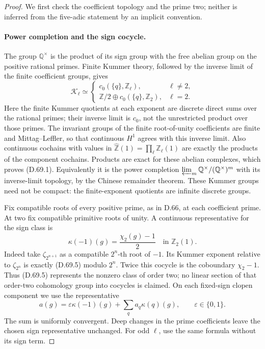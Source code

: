 \begin{proof}
We first check the coefficient topology and the
prime two; neither is inferred from the five-adic
statement by an implicit convention.

\paragraph{Power completion and the sign cocycle.}
The group \(\mathbb Q^\times\) is the product of
its sign group with the free abelian group on
the positive rational primes. Finite Kummer theory,
followed by the inverse limit of the finite
coefficient groups, gives
\[
 \mathcal K_\ell\simeq
 \begin{cases}
 c_0(\{q\},\mathbb Z_\ell),&\ell\ne2,\\
 \mathbb Z/2\oplus c_0(\{q\},\mathbb Z_2),&\ell=2.
 \end{cases}                                           \tag{D.69.4}
\]
Here the finite Kummer quotients at each exponent
are discrete direct sums over the rational primes;
their inverse limit is \(c_0\), not the unrestricted
product over those primes. The invariant groups
of the finite root-of-unity coefficients are
finite and Mittag--Leffler, so that continuous
\(H^1\) agrees with this inverse limit.
Also continuous cochains with values in
\(\widehat{\mathbb Z}(1)=\prod_\ell\mathbb Z_\ell(1)\)
are exactly the products of the component cochains.
Products are exact for these abelian complexes,
which proves (D.69.1). Equivalently it is the
power completion
\(\varprojlim_m\mathbb Q^\times/(\mathbb Q^\times)^m\)
with its inverse-limit topology, by the Chinese
remainder theorem. These Kummer groups need not
be compact: the finite-exponent quotients are
infinite discrete groups.

Fix compatible roots of every positive prime,
as in D.66, at each coefficient prime. At two
fix compatible primitive roots of unity. A
continuous representative for the sign class is
\[
            \kappa(-1)(g)=\frac{\chi_2(g)-1}{2}
                          \quad\text{in }\mathbb Z_2(1).
                                                        \tag{D.69.5}
\]
Indeed take \(\zeta_{2^{n+1}}\) as a compatible
\(2^n\)-th root of \(-1\). Its Kummer exponent
relative to \(\zeta_{2^n}\) is exactly (D.69.5)
modulo \(2^n\). Twice this cocycle is the
coboundary \(\chi_2-1\). Thus (D.69.5) represents
the nonzero class of order two; no linear section
of that order-two cohomology group into cocycles
is claimed. On each fixed-sign clopen component
we use the representative
\[
             a(g)=\varepsilon\kappa(-1)(g)
                         +\sum_q a_q\kappa(q)(g),
                    \qquad \varepsilon\in\{0,1\}.
                                                        \tag{D.69.6}
\]
The sum is uniformly convergent. Deep changes in
the prime coefficients leave the chosen sign
representative unchanged. For odd \(\ell\),
use the same formula without its sign term.


\end{proof}
